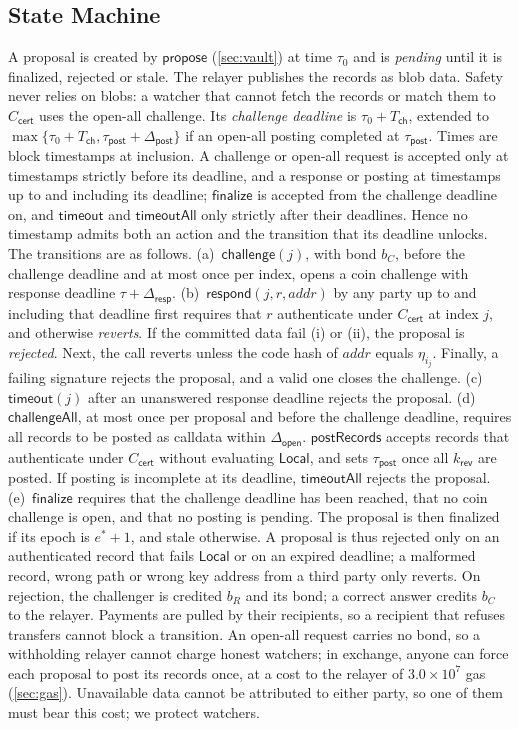 \documentclass[10pt,journal,compsoc]{IEEEtran}
\theoremstyle{tplain}
\theoremstyle{tdef}
\theoremstyle{remark}
\newcommand{\kr}{k_{\mathsf{rev}}}
\newcommand{\cert}{\mathsf{cert}}
\begin{document}
\subsection{State Machine}\label{S-opf-sm}
A proposal is created by $\mathsf{propose}$ (\cref{sec:vault}) at time $\tau_0$ and is \emph{pending} until it is finalized, rejected or stale. The relayer publishes the records as blob data. Safety never relies on blobs: a watcher that cannot fetch the records or match them to $C_{\cert}$ uses the open-all challenge. Its \emph{challenge deadline} is $\tau_0+T_{\mathsf{ch}}$, extended to $\max\{\tau_0+T_{\mathsf{ch}},\tau_{\mathsf{post}}+\Delta_{\mathsf{post}}\}$ if an open-all posting completed at $\tau_{\mathsf{post}}$. Times are block timestamps at inclusion. A challenge or open-all request is accepted only at timestamps strictly before its deadline, and a response or posting at timestamps up to and including its deadline; $\mathsf{finalize}$ is accepted from the challenge deadline on, and $\mathsf{timeout}$ and $\mathsf{timeoutAll}$ only strictly after their deadlines. Hence no timestamp admits both an action and the transition that its deadline unlocks. The transitions are as follows. (a)~$\mathsf{challenge}(j)$, with bond $b_C$, before the challenge deadline and at most once per index, opens a coin challenge with response deadline $\tau+\Delta_{\mathsf{resp}}$. (b)~$\mathsf{respond}(j,r,\mathit{addr})$ by any party up to and including that deadline first requires that $r$ authenticate under $C_{\cert}$ at index $j$, and otherwise \emph{reverts}. If the committed data fail (i) or (ii), the proposal is \emph{rejected}. Next, the call reverts unless the code hash of $\mathit{addr}$ equals $\eta_{i_j}$. Finally, a failing signature rejects the proposal, and a valid one closes the challenge. (c)~$\mathsf{timeout}(j)$ after an unanswered response deadline rejects the proposal. (d)~$\mathsf{challengeAll}$, at most once per proposal and before the challenge deadline, requires all records to be posted as calldata within $\Delta_{\mathsf{open}}$. $\mathsf{postRecords}$ accepts records that authenticate under $C_{\cert}$ without evaluating $\mathsf{Local}$, and sets $\tau_{\mathsf{post}}$ once all $\kr$ are posted. If posting is incomplete at its deadline, $\mathsf{timeoutAll}$ rejects the proposal. (e)~$\mathsf{finalize}$ requires that the challenge deadline has been reached, that no coin challenge is open, and that no posting is pending. The proposal is then finalized if its epoch is $e^\ast+1$, and stale otherwise.
A proposal is thus rejected only on an authenticated record that fails $\mathsf{Local}$ or on an expired deadline; a malformed record, wrong path or wrong key address from a third party only reverts. On rejection, the challenger is credited $b_R$ and its bond; a correct answer credits $b_C$ to the relayer. Payments are pulled by their recipients, so a recipient that refuses transfers cannot block a transition. An open-all request carries no bond, so a withholding relayer cannot charge honest watchers; in exchange, anyone can force each proposal to post its records once, at a cost to the relayer of $3.0\times10^7$ gas (\cref{sec:gas}). Unavailable data cannot be attributed to either party, so one of them must bear this cost; we protect watchers.
\end{document}

